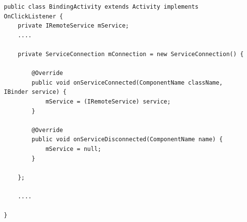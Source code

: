 \begin{lstlisting}[frame=single]
public class BindingActivity extends Activity implements OnClickListener {
	private IRemoteService mService;
	....

	private ServiceConnection mConnection = new ServiceConnection() {

		@Override
		public void onServiceConnected(ComponentName className, IBinder service) {
			mService = (IRemoteService) service;
		}

		@Override
		public void onServiceDisconnected(ComponentName name) {
			mService = null;
		}

	};

	....
	
}
\end{lstlisting}

